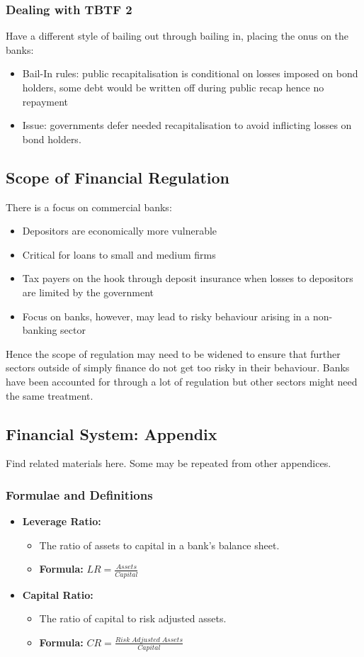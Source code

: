\documentclass[12pt, letterpaper]{article}
\begin{document}
\subsubsection{Dealing with TBTF 2}
Have a different style of bailing out through bailing in, placing the onus on the banks:
\begin{itemize}
	\item Bail-In rules: public recapitalisation is conditional on losses imposed on bond holders, some debt would be written off during public recap hence no repayment
	\item Issue: governments defer needed recapitalisation to avoid inflicting losses on bond holders.
\end{itemize}

\subsection{Scope of Financial Regulation}
There is a focus on commercial banks:
\begin{itemize}
	\item Depositors are economically more vulnerable
	\item Critical for loans to small and medium firms
	\item Tax payers on the hook through deposit insurance when losses to depositors are limited by the government
	\item Focus on banks, however, may lead to risky behaviour arising in a non-banking sector
\end{itemize}
Hence the scope of regulation may need to be widened to ensure that further sectors outside of simply finance do not get too risky in their behaviour. Banks have been accounted for through a lot of regulation but other sectors might need the same treatment.

\subsection{Financial System: Appendix}
Find related materials here. Some may be repeated from other appendices.
\subsubsection{Formulae and Definitions}
\begin{itemize}
	\item \textbf{Leverage Ratio:}
		\begin{itemize}
			\item The ratio of assets to capital in a bank's balance sheet.
			\item \textbf{Formula:} $LR = \frac{Assets}{Capital}$
		\end{itemize}
	\item \textbf{Capital Ratio:}
		\begin{itemize}
			\item The ratio of capital to risk adjusted assets.
			\item \textbf{Formula:} $CR = \frac{Risk\;Adjusted\;Assets}{Capital}$
		\end{itemize}
\end{itemize}
\end{document}
